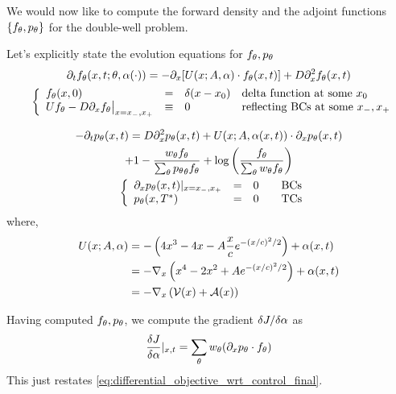 \documentclass{article}
\begin{document}
We would now like to compute the forward density and the adjoint functions
$\{{ f_{\theta}}, { p_{\theta}}\}$ for the double-well problem.

Let's explicitly state the evolution equations for ${ f_{\theta}},{ p_{\theta}}$
\begin{equation}
\begin{gathered}
{\partial}_t { f_{\theta}}(x,t; {\theta}, {\alpha}(\cdot)) = -{\partial}_x [ U(x;A, {\alpha}) \cdot { f_{\theta}}(x,t)] + D {\partial}_x^2
{ f_{\theta}}(x,t)
\\
\begin{array}{ll}
	&
	\left\{ \begin{array}{lcll}
	 { f_{\theta}}(x,0) &=& \delta(x-x_0)  &\textrm{delta function at some } x_0
	\\
	U { f_{\theta}} - D {\partial}_x { f_{\theta}} \big|_{x={ x_{-} },{ x_{+} }} &\equiv& 0 & \textrm{reflecting BCs
	at some } { x_{-} }, { x_{+} } \end{array} \right.
\end{array}
\label{eq:forward_density_double_well}
\end{gathered}
\end{equation}

\begin{equation}
\begin{gathered}
-{\partial}_t { p_{\theta}}(x,t) =
D {\partial}_x^2 { p_{\theta}}(x,t) +
U(x;A, {\alpha}(x,t))\cdot {\partial}_x { p_{\theta}}(x,t) \\
+ 1 - \frac{  w_{\theta} { f_{\theta}} }{\sum_{\theta} { p_{\theta}}_{\theta}{ f_{\theta}}} 
+ \log\left(\frac{f_{\theta}} {\sum_{\theta} { w_{\theta} } { f_{\theta}} }\right)
\\
\begin{array}{ll}
	&
	\left\{ \begin{array}{lcll}
	{\partial}_x { p_{\theta}}(x, t)|_{x = { x_{-} }, { x_{+} }}  &=& 0  \quad &\textrm{BCs}
	\\
	{ p_{\theta}}(x,{ T^* })  &=& 0 \,& \textrm{TCs}
\end{array} \right.
\end{array}
\label{eq:backward_adjoint_double_well}
\end{gathered}
\end{equation}
where,  
\begin{eqnarray*}
U(x; A, {\alpha}) &= -\left( 4x^3 - 4x -A \frac xc e^{-(x/c)^2/2} \right) + {\alpha}(x,t)
\\
&= -{ \nabla }_x \left( x^4  - 2x^2 + A e^{-(x/c)^2/2} \right)  + {\alpha}(x,t)
\\
&= -{ \nabla }_x \left(\mathcal V(x) + \mathcal{A}(x) \right)
\end{eqnarray*}

Having computed ${ f_{\theta}}, { p_{\theta}}$, we compute the gradient $\delta J / \delta {\alpha}$
as
$$
\frac {\delta J}{\delta {\alpha}} |_{x,t} = \sum_{\theta} { w_{\theta} } ({\partial}_x { p_{\theta}} \cdot { f_{\theta}})
$$
This just restates \cref{eq:differential_objective_wrt_control_final}.
\end{document}
